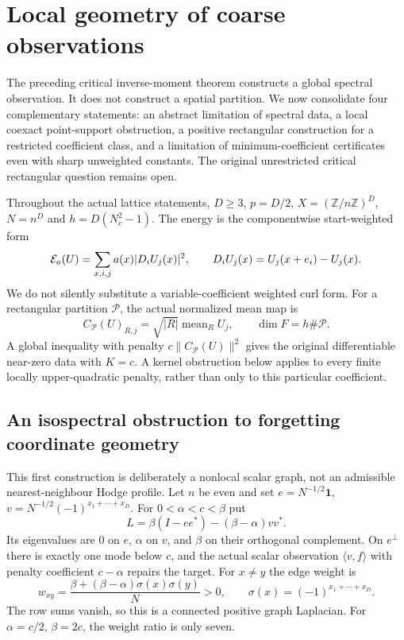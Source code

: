 \clearpage
\section{Local geometry of coarse observations}\label{sec:geometry183}
The preceding critical inverse-moment theorem constructs a global spectral
observation. It does not construct a spatial partition. We now consolidate
four complementary statements: an abstract limitation of spectral data,
a local coexact point-support obstruction, a positive rectangular construction
for a restricted coefficient class, and a limitation of minimum-coefficient
certificates even with sharp unweighted constants. The original unrestricted
critical rectangular question remains open.

Throughout the actual lattice statements, $D\geq3$, $p=D/2$,
$X=(\mathbb Z/n\mathbb Z)^D$, $N=n^D$ and $h=D(N_c^2-1)$.
The energy is the componentwise start-weighted form
\[
 \mathcal E_a(U)=\sum_{x,i,j}a(x)|D_iU_j(x)|^2,\qquad
 D_iU_j(x)=U_j(x+e_i)-U_j(x).
\]
We do not silently substitute a variable-coefficient weighted curl form.
For a rectangular partition $\mathcal P$, the actual normalized mean map is
\[
 C_{\mathcal P}(U)_{R,j}=\sqrt{|R|}\operatorname{mean}_R U_j,
 \qquad \dim F=h\#\mathcal P.
\]
A global inequality with penalty $c\|C_{\mathcal P}(U)\|^2$ gives the
original differentiable near-zero data with $K=c$. A kernel obstruction
below applies to every finite locally upper-quadratic penalty, rather
than only to this particular coefficient.

\subsection{An isospectral obstruction to forgetting coordinate geometry}
This first construction is deliberately a nonlocal scalar graph, not an
admissible nearest-neighbour Hodge profile. Let $n$ be even and set
$e=N^{-1/2}\mathbf1$, $v=N^{-1/2}(-1)^{x_1+\cdots+x_D}$. For $0<\alpha<c<\beta$ put
\[
 L=\beta(I-ee^*)-(\beta-\alpha)vv^*.
\]
Its eigenvalues are $0$ on $e$, $\alpha$ on $v$, and $\beta$ on their
orthogonal complement. On $e^\perp$ there is exactly one mode below $c$,
and the actual scalar observation $\langle v,f\rangle$ with penalty
coefficient $c-\alpha$ repairs the target. For $x\ne y$ the edge weight is
\[
 w_{xy}=\frac{\beta+(\beta-\alpha)\sigma(x)\sigma(y)}N>0,
 \qquad \sigma(x)=(-1)^{x_1+\cdots+x_D}.
\]
The row sums vanish, so this is a connected positive graph Laplacian.
For $\alpha=c/2$, $\beta=2c$, the weight ratio is only seven.

